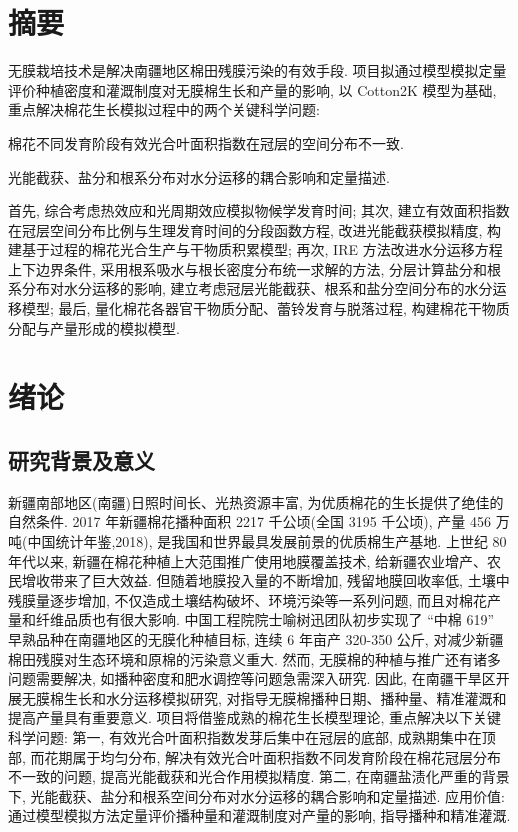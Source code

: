 \documentclass[a4paper,zihao=5]{ctexbook}
\begin{document}

\chapter*{摘要}
无膜栽培技术是解决南疆地区棉田残膜污染的有效手段.
项目拟通过模型模拟定量评价种植密度和灌溉制度对无膜棉生长和产量的影响,
以 Cotton2K 模型为基础, 重点解决棉花生长模拟过程中的两个关键科学问题:
\begin{enumerate*}
    \item 棉花不同发育阶段有效光合叶面积指数在冠层的空间分布不一致.
    \item 光能截获、盐分和根系分布对水分运移的耦合影响和定量描述.
\end{enumerate*}
首先, 综合考虑热效应和光周期效应模拟物候学发育时间;
其次, 建立有效面积指数在冠层空间分布比例与生理发育时间的分段函数方程, 改进光能截获模拟精度, 构建基于过程的棉花光合生产与干物质积累模型;
再次, IRE 方法改进水分运移方程上下边界条件, 采用根系吸水与根长密度分布统一求解的方法, 分层计算盐分和根系分布对水分运移的影响, 建立考虑冠层光能截获、根系和盐分空间分布的水分运移模型;
最后, 量化棉花各器官干物质分配、蕾铃发育与脱落过程, 构建棉花干物质分配与产量形成的模拟模型.

\chapter{绪论}
\section{研究背景及意义}
新疆南部地区(南疆)日照时间长、光热资源丰富, 为优质棉花的生长提供了绝佳的自然条件.
2017 年新疆棉花播种面积 2217 千公顷(全国 3195 千公顷), 产量 456 万吨(中国统计年鉴,2018), 是我国和世界最具发展前景的优质棉生产基地.
上世纪 80 年代以来, 新疆在棉花种植上大范围推广使用地膜覆盖技术, 给新疆农业增产、农民增收带来了巨大效益.
但随着地膜投入量的不断增加, 残留地膜回收率低, 土壤中残膜量逐步增加, 不仅造成土壤结构破坏、环境污染等一系列问题, 而且对棉花产量和纤维品质也有很大影响.
中国工程院院士喻树迅团队初步实现了 “中棉 619” 早熟品种在南疆地区的无膜化种植目标, 连续 6 年亩产 320-350 公斤, 对减少新疆棉田残膜对生态环境和原棉的污染意义重大.
然而, 无膜棉的种植与推广还有诸多问题需要解决, 如播种密度和肥水调控等问题急需深入研究.
因此, 在南疆干旱区开展无膜棉生长和水分运移模拟研究,
对指导无膜棉播种日期、播种量、精准灌溉和提高产量具有重要意义.
项目将借鉴成熟的棉花生长模型理论, 重点解决以下关键科学问题:
第一, 有效光合叶面积指数发芽后集中在冠层的底部, 成熟期集中在顶部, 而花期属于均匀分布, 解决有效光合叶面积指数不同发育阶段在棉花冠层分布不一致的问题, 提高光能截获和光合作用模拟精度.
第二, 在南疆盐渍化严重的背景下, 光能截获、盐分和根系空间分布对水分运移的耦合影响和定量描述.
应用价值: 通过模型模拟方法定量评价播种量和灌溉制度对产量的影响, 指导播种和精准灌溉.
\end{document}
